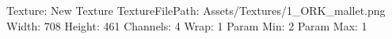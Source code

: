 Texture: New Texture
TextureFilePath: Assets/Textures/1_ORK_mallet.png
Width: 708
Height: 461
Channels: 4
Wrap: 1
Param Min: 2
Param Max: 1
